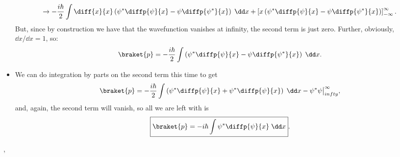 \begin{itemize}
        \begin{equation*}
            \rightarrow -\frac{i\hbar}{2} \int \diff{x}{x} \left(\psi^*\diffp{\psi}{x} - \psi\diffp{\psi^*}{x}\right) \;\dd x + \left[x\left(\psi^*\diffp{\psi}{x} - \psi\diffp{\psi^*}{x}\right)\right]_{-\infty}^{\infty}.
        \end{equation*}
        But, since by construction we have that the wavefunction vanishes at infinity, the second term is just zero. Further, obviously, $\dd x/\dd x = 1$, so:
        \begin{equation*}
            \braket{p} = -\frac{i\hbar}{2} \int \left(\psi^*\diffp{\psi}{x} - \psi\diffp{\psi^*}{x}\right) \;\dd x.
        \end{equation*}
    \item We can do integration by parts on the second term this time to get 
        \begin{equation*}
            \braket{p} = -\frac{i\hbar}{2} \int \left(\psi^*\diffp{\psi}{x} + \psi^*\diffp{\psi}{x}\right) \;\dd x - \psi^*\psi \big|_{\-infty}^{\infty},
        \end{equation*}
        and, again, the second term will vanish, so all we are left with is
        \begin{equation}
            \boxed{\braket{p} = -i\hbar \int \psi^* \diffp{\psi}{x} \;\dd x}.
        \end{equation}
\end{itemize}

\sep


